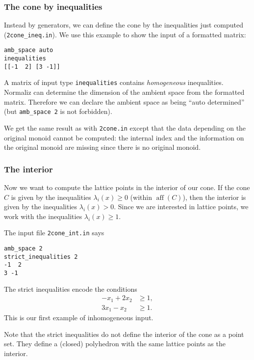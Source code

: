 \documentclass[12pt,a4paper]{scrartcl}
\theoremstyle{definition}
\DeclareMathOperator{\aff}{aff}
\begin{document}
\subsubsection{The cone by inequalities}\label{ineq_ex}

Instead by generators, we can define the cone by the inequalities just computed (\verb|2cone_ineq.in|). We use this example to show the input of a formatted matrix:
\begin{Verbatim}
amb_space auto
inequalities
[[-1  2] [3 -1]]
\end{Verbatim}
A matrix of input type \verb|inequalities| contains \emph{homogeneous} inequalities. Normaliz can determine the dimension of the ambient space from the formatted matrix. Therefore we can declare the ambient space as being ``auto determined'' (but \verb|amb_space 2| is not forbidden).

We get the same result as with \verb|2cone.in| except that the data depending on the original monoid cannot be computed: the internal index and the information on the original monoid are missing since there is no original monoid.

\subsubsection{The interior}\label{strict_ex}
Now we want to compute the lattice points in the interior of our cone. If the cone $C$ is given by the inequalities $\lambda_i(x)\ge0$ (within $\aff(C)$), then the interior is given by the inequalities $\lambda_i(x)>0$. Since we are interested in lattice points, we work with the inequalities $\lambda_i(x)\ge 1$.


The input file \verb|2cone_int.in| says
\begin{Verbatim}
amb_space 2
strict_inequalities 2
-1  2
3 -1
\end{Verbatim}
The strict inequalities encode the conditions
\begin{align*}
-x_1+2x_2&\ge 1,\\
3x_1-x_2&\ge 1.
\end{align*}
This is our first example of inhomogeneous input.

Note that the strict inequalities do not define the interior of the cone as a point set. They define a (closed) polyhedron with the same lattice points as the interior.
\end{document}
